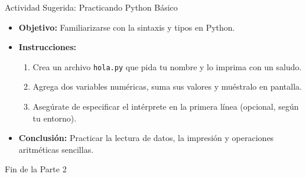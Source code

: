 \documentclass[10pt]{beamer}
\begin{document}
\begin{frame}{Actividad Sugerida: Practicando Python Básico}
\begin{itemize}
    \item \textbf{Objetivo:} Familiarizarse con la sintaxis y tipos en Python.
    \item \textbf{Instrucciones:}
    \begin{enumerate}
        \item Crea un archivo \texttt{hola.py} que pida tu nombre y lo imprima con un saludo.
        \item Agrega dos variables numéricas, suma sus valores y muéstralo en pantalla.
        \item Asegúrate de especificar el intérprete en la primera línea (opcional, según tu entorno).
    \end{enumerate}
    \item \textbf{Conclusión:} Practicar la lectura de datos, la impresión y operaciones aritméticas sencillas.
\end{itemize}
\end{frame}

\begin{frame}
\Huge{\centerline{Fin de la Parte 2}}
\end{frame}
\end{document}

